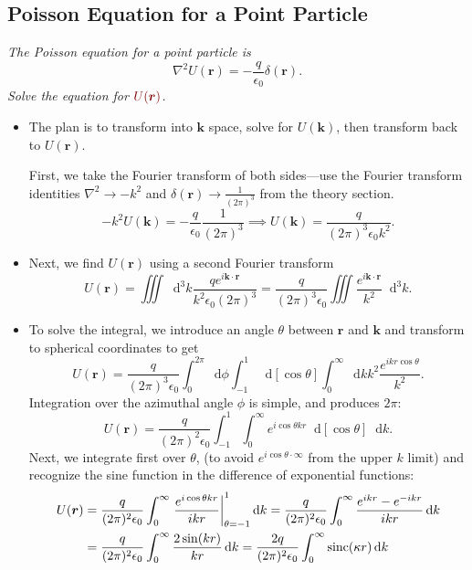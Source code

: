 \documentclass[11pt, a4paper]{article}
\newcommand{\diff}{\mathop{}\!\mathrm{d}} %
\newcommand{\dmath}[1]{\textcolor{Maroon}{#1}}  %
\renewcommand{\vec}[1]{\bm{#1}} %
\renewcommand{\r}{\vec{r}}
\newcommand{\ee}{\epsilon_{0}}  %
\begin{document}
\subsection{Poisson Equation for a Point Particle}
\textit{The Poisson equation for a point particle is}
\begin{equation*}
	\nabla^{2}U(\r) = - \frac{q}{\ee} \delta (\r).
\end{equation*}
\textit{Solve the equation for $ \dmath{U(\r)} $.}
\begin{itemize}
	
	\item The plan is to transform into $ \vec{k} $ space, solve for $ U(\vec{k}) $, then transform back to $ U(\r) $. 
	
	First, we take the Fourier transform of both sides---use the Fourier transform identities $ \nabla^{2} \to -k^{2} $ and $ \delta(\r) \to \frac{1}{(2\pi)^{3}} $ from the theory section.
	\begin{equation*}
		- k^{2}U(\vec{k}) = - \frac{q}{\ee} \frac{1}{(2\pi)^{3}} \implies U(\vec{k}) = \frac{q}{(2\pi)^{3} \ee k^{2}}.
	\end{equation*}
	
	\item Next, we find $ U(\r) $ using a second Fourier transform
	\begin{equation*}
		U(\r) = \iiint \diff^{3} k \frac{q e^{i\vec{k}\cdot \r}}{k^{2}\ee(2\pi)^{3}} = \frac{q}{(2\pi)^{3}\ee} \iiint \frac{e^{i\vec{k}\cdot \r}}{k^{2}} \diff^{3}k.
    \end{equation*}
	
    \item To solve the integral, we introduce an angle $ \theta $ between $ \r $ and $ \vec{k} $ and transform to spherical coordinates to get
	\begin{equation*}
		U(\r) =  \frac{q}{(2\pi)^{3}\ee} \int_{0}^{2\pi}\diff \phi \int_{-1}^{1} \diff [\cos \theta] \int_{0}^{\infty} \diff k k^{2} \frac{e^{ik r\cos \theta}}{k^{2}}.
	\end{equation*}
	Integration over the azimuthal angle $ \phi $ is simple, and produces $ 2\pi $:
	\begin{equation*}
		U(\r) = \frac{q}{(2\pi)^{2}\ee} \int_{-1}^{1}\int_{0}^{\infty} e^{i \cos \theta k r} \diff[\cos \theta] \diff k. 
	\end{equation*}
	Next, we integrate first over $ \theta $, (to avoid $ e^{i \cos \theta \cdot \infty} $ from the upper $ k $ limit) and recognize the sine function in the difference of exponential functions:
	\begin{align*}
        U(\r) &= \frac{q}{(2\pi)^{2}\ee} \int_{0}^{\infty} \eval{\frac{e^{i \cos \theta k r}}{i k r}}_{\theta = -1}^{1} \diff k = \frac{q}{(2\pi)^{2}\ee} \int_{0}^{\infty}\frac{e^{ikr}-e^{-ikr}}{ikr} \diff k \\
        & = \frac{q}{(2\pi)^{2}\ee} \int_{0}^{\infty}\frac{2\sin (kr)}{kr} \diff k = \frac{2q}{(2\pi)^{2}\ee} \int_{0}^{\infty} \operatorname{sinc}(\kappa r) \diff k
	\end{align*}


\end{itemize}
\end{document}
